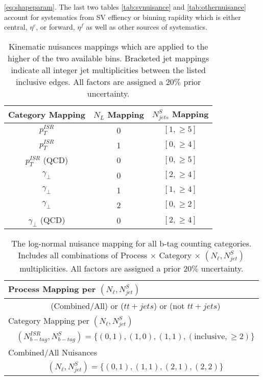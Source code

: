 \ref{eq:shapeparam}. The last two tables \ref{tab:svnuisance} and \ref{tab:othernuisance} account for systematics from SV effiency or binning rapidity which is either central, $\eta^c$, or forward, $\eta^f$ as well as other sources of systematics.

\begin{table}
\centering
\caption{Kinematic nuisances mappings which are applied to the higher of the two available bins. Bracketed jet mappings indicate all integer jet multiplicities between the listed inclusive edges. All factors are assigned a $20\%$ prior uncertainty.}
\begin{tabular}{ccc}
\hline 
Category Mapping & $N_L$ Mapping & $N_{jets}^S$  Mapping \\ 
\hline 
\hline
$p_T^{ISR}$  & 0 & $[1,\geq5]$ \\ 
$p_T^{ISR}$ & 1 & $[0,\geq4]$ \\ 
$p_T^{ISR}$ (QCD) & 0 & $[0,\geq5]$ \\ 
$\gamma_\perp$ & 0 & $[2,\geq4]$ \\ 
$\gamma_\perp$ & 1 & $[1,\geq4]$ \\ 
$\gamma_\perp$ & 2 & $[0,\geq2]$ \\  
$\gamma_\perp$ (QCD) & 0 & $[2,\geq4]$ \\ 
\hline 
\end{tabular} 
\label{tab:kinnuisance}
\end{table}


\begingroup

\begin{table}
\centering
\caption{The log-normal nuisance mapping for all b-tag counting categories. Includes all combinations of Process $\times$ Category $\times$ $(N_\ell,N_{jet}^S)$ multiplicities. All factors are assigned a prior $20\%$ uncertainty.}
\setlength{\tabcolsep}{10pt} %
\renewcommand{\arraystretch}{1.5} %
\begin{tabular}{lc}

\multicolumn{2}{|l}{Process Mapping per $(N_\ell,N_{jet}^S)$ } \\ 
\hline 
 & (Combined/All) or ($tt+jets$) or (not $tt+jets$)  \\ 
\multicolumn{2}{|l}{Category Mapping per $(N_\ell,N_{jet}^S)$ } \\ 
\hline 
 & $(N_{b-tag}^{ISR},N_{b-tag}^S)=\{(0,1),(1,0),(1,1),( \text{inclusive} ,\geq2) \}$ \\ 
\multicolumn{2}{|l}{Combined/All Nuisances}  \\ 
\hline 
 & $(N_\ell,N_{jet}^S)=\{(0,1),(1,1),(2,1),(2,2) \}$ \\ 

\end{tabular} 
\label{tab:btagnuisance}
\end{table}
\endgroup

